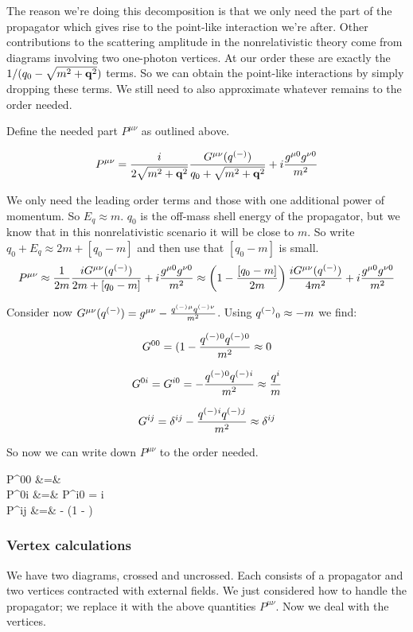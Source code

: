 The reason we're doing this decomposition is that we only need the part of the propagator which gives rise to the point-like interaction we're after.  Other contributions to the scattering amplitude in the nonrelativistic theory come from diagrams involving two one-photon vertices.  At our order these are exactly the $1/(q_0 - \sqrt{ m^2 + \mathbf{q}^2 })$ terms.  So we can obtain the point-like interactions by simply dropping these terms.  We still need to also approximate whatever remains to the order needed.

Define the needed part $P^{\mu\nu}$ as outlined above.

\[
	P^{\mu\nu} =    \frac{i}{2 \sqrt{ m^2 + \mathbf{q}^2 }} \frac{ G^{\mu\nu}(q^{(-)}{})  }{q_0 + \sqrt{ m^2 + \mathbf{q}^2 } } + i\frac{g^{\mu0} g^{\nu0}}{m^2}
\]


We only need the leading order terms and those with one additional power of momentum.  So $E_q  \approx m$.  $q_0$ is the off-mass shell energy of the propagator, but we know that in this nonrelativistic scenario it will be close to $m$.  So write $q_0 + E_q \approx 2m + [q_0-m]$ and then use that $[q_0-m]$ is small.
\[
	P^{\mu\nu} \approx   \frac{1}{2m} \frac{i G^{\mu\nu}(q^{(-)}{})  }{2m + [q_0-m]} + i\frac{g^{\mu0} g^{\nu0}}{m^2}
			\approx \left( 1 - \frac{[q_0-m]}{2m} \right )\frac{ i G^{\mu\nu}(q^{(-)}{})  }{4m^2} + i \frac{g^{\mu0} g^{\nu0}}{m^2}
\]

Consider now $G^{\mu\nu}(q^{(-)}{}) = g^{\mu\nu} - \frac{q^{(-)}{}^\mu q^{(-)}{}^\nu}{m^2}$.  Using $q^{(-)}{}_0 \approx -m$ we find:

\[
	G^{00} = (1 - \frac{q^{(-)}{}^0 q^{(-)}{}^0}{m^2} \approx  0
\]

\[
	G^{0i} = G^{i0} =  - \frac{q^{(-)}{}^0 q^{(-)}{}^i}{m^2} \approx  \frac{q^i}{m}
\]


\[
	G^{ij} = \delta^{ij} - \frac{q^{(-)}{}^i q^{(-)}{}^j}{m^2} \approx \delta^{ij}
\]

So now we can write down $P^{\mu\nu}$ to the order needed.

\beqa
 P^{00} &=&  	\\
 P^{0i} &=& P^{i0} = i		\\
 P^{ij} &=& - \left(1 -  \right ) 	
\eeqa


\subsubsection{Vertex calculations}

We have two diagrams, crossed and uncrossed.  Each consists of a propagator and two vertices contracted with external fields.  We just considered how to handle the propagator; we replace it with the above quantities $P^{\mu\nu}$.  Now we deal with the vertices.  


